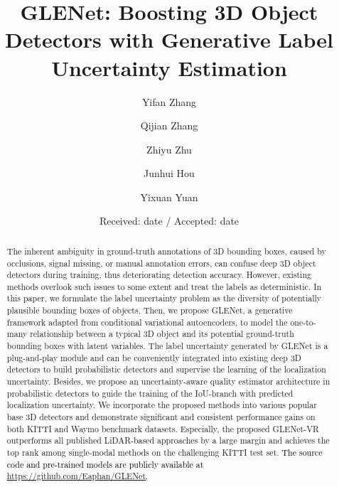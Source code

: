 \documentclass[twocolumn]{svjour3}
\newcommand{\revise}[1]{\textcolor{black}{#1}}
\begin{document}
\title{GLENet: Boosting 3D Object Detectors with Generative Label Uncertainty Estimation}

\author{Yifan Zhang \and Qijian Zhang \and Zhiyu Zhu \and Junhui Hou \and Yixuan Yuan}




\date{Received: date / Accepted: date}



\maketitle
\begin{abstract}
The inherent ambiguity in ground-truth annotations of 3D bounding boxes, caused by occlusions, signal missing, or manual annotation errors, can confuse deep 3D object detectors during training, thus deteriorating detection accuracy. However, existing methods overlook such issues to some extent and treat the labels as deterministic. In this paper, we formulate the label uncertainty problem as the diversity of potentially plausible bounding boxes of objects. Then, we propose GLENet, a generative framework adapted from conditional variational autoencoders, to model the one-to-many relationship between a typical 3D object and its potential ground-truth bounding boxes with latent variables. The label uncertainty generated by GLENet is a plug-and-play module and can be conveniently integrated into existing deep 3D detectors to build probabilistic detectors and supervise the learning of the localization uncertainty. Besides, we propose an uncertainty-aware quality estimator architecture in probabilistic detectors to guide the training of the IoU-branch with predicted localization uncertainty. We incorporate the proposed methods into various popular base 3D detectors and demonstrate significant and consistent performance gains on both KITTI and Waymo benchmark datasets. Especially, the proposed GLENet-VR outperforms all published LiDAR-based approaches by a large margin and achieves the top rank among single-modal methods on the challenging KITTI test set.
\revise{The source code and pre-trained models are publicly available at \url{https://github.com/Eaphan/GLENet}.}


\end{abstract}
\end{document}
